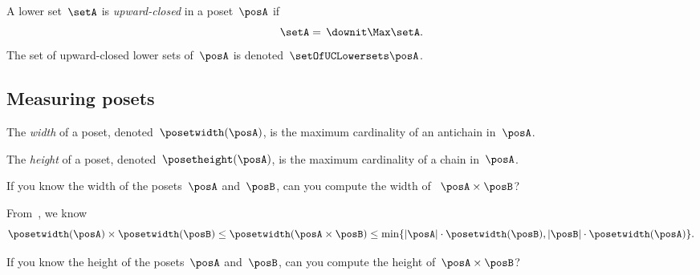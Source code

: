 \begin{definition}
    \label{def:upward-closed-lowerset}
    A lower set~$\setA$ is \emph{upward-closed} in a poset~$\posA$ if
    \begin{equation}
        \setA =\, \downit  \Max \setA.
    \end{equation}
    The set of upward-closed lower sets of~$\posA$ is denoted~$\setOfUCLowersets \posA$.

\end{definition}


\subsection{Measuring posets}
\begin{definition}
    \label{def:poset-width}
    The \emph{width} of a poset, denoted~$\posetwidth(\posA)$, is the maximum cardinality of an antichain in~$\posA$.
\end{definition}

\begin{definition}
    \label{def:poset-height}
    The \emph{height} of a poset, denoted~$\posetheight(\posA)$, is the maximum cardinality of a chain in~$\posA$.
\end{definition}

\begin{exercise}
    \label{ex:width}
    If you know the width of the posets~$\posA$ and~$\posB$, can you compute the width of ~$\posA\times\posB$?
\end{exercise}
\begin{solution}
    From~\cite{bezrukovantichains}, we know
    \begin{equation*}
        \posetwidth(\posA)\times \posetwidth(\posB)\leq \posetwidth(\posA\times \posB)\leq \min \{ \vert \posA\vert \cdot \posetwidth(\posB),\vert \posB \vert \cdot \posetwidth(\posA)\}.
    \end{equation*}
\end{solution}

\begin{exercise}
    \label{ex:height}
    If you know the height of the posets~$\posA$ and~$\posB$, can you compute the height of~$\posA\times\posB$?
\end{exercise}

